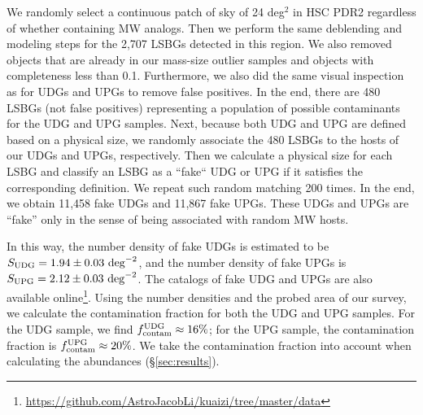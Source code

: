 \documentclass[twocolumn,astrosymb,twocolappendix]{aastex631}
\begin{document}
\begin{CJK*}{UTF8}{gbsn}
We randomly select a continuous patch of sky of 24 deg$^{2}$ in HSC PDR2 regardless of whether containing MW analogs. Then we perform the same deblending and modeling steps for the 2,707 LSBGs detected in this region. We also removed objects that are already in our mass-size outlier samples and objects with completeness less than 0.1. Furthermore, we also did the same visual inspection as for UDGs and UPGs to remove false positives. In the end, there are 480 LSBGs (not false positives) representing a population of possible contaminants for the UDG and UPG samples. Next, because both UDG and UPG are defined based on a physical size, we randomly associate the 480 LSBGs to the hosts of our UDGs and UPGs, respectively. Then we calculate a physical size for each LSBG and classify an LSBG as a ``fake`` UDG or UPG if it satisfies the corresponding definition. We repeat such random matching 200 times. In the end, we obtain 11,458 fake UDGs and 11,867 fake UPGs. These UDGs and UPGs are ``fake'' only in the sense of being associated with random MW hosts. 

In this way, the number density of fake UDGs is estimated to be $S_{\rm UDG} = 1.94\pm0.03\ \mathrm{deg}^{-2}$, and the number density of fake UPGs is $S_{\rm UPG} = 2.12\pm0.03\ \mathrm{deg}^{-2}$. The catalogs of fake UDG and UPGs are also available online\footnote{\url{https://github.com/AstroJacobLi/kuaizi/tree/master/data}}. Using the number densities and the probed area of our survey, we calculate the contamination fraction for both the UDG and UPG samples. For the UDG sample, we find $f_{\rm contam}^{\rm UDG} \approx 16\%$; for the UPG sample, the contamination fraction is $f_{\rm contam}^{\rm UPG} \approx 20\%$. We take the contamination fraction into account when calculating the abundances (\S\ref{sec:results}).


\end{CJK*}
\end{document}

